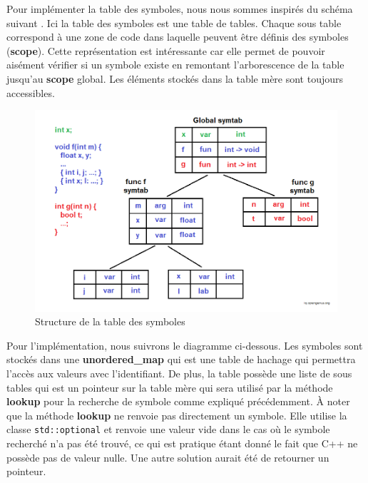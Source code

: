 \documentclass[a4paper]{article}%
\begin{document}
Pour implémenter la table des symboles, nous nous sommes inspirés du schéma
suivant \cite{symtableGenius}. Ici la table des symboles est une table de
tables. Chaque sous table correspond à une zone de code dans laquelle peuvent
être définis des symboles (\textbf{scope}). Cette représentation est
intéressante car elle permet de pouvoir aisément vérifier si un symbole existe
en remontant l'arborescence de la table jusqu'au \textbf{scope} global. Les
éléments stockés dans la table mère sont toujours accessibles.
\clearpage

\begin{figure}[h!]
  \begin{center}
  \includegraphics[scale=0.5]{./img/symtable.png}
  \caption{Structure de la table des symboles}
  \end{center}
\end{figure}

Pour l'implémentation, nous suivrons le diagramme ci-dessous. Les symboles sont
stockés dans une \textbf{unordered\_map} qui est une table de hachage qui
permettra l'accès aux valeurs avec l'identifiant. De plus, la table
possède une liste de sous tables qui est un pointeur sur la table mère qui sera
utilisé par la méthode \textbf{lookup} pour la recherche de symbole comme
expliqué précédemment. À noter que la méthode \textbf{lookup} ne renvoie pas
directement un symbole. Elle utilise la classe \lstinline{std::optional} et
renvoie une valeur vide dans le cas où le symbole recherché n'a pas été trouvé,
ce qui est pratique étant donné le fait que C++ ne possède pas de valeur nulle.
Une autre solution aurait été de retourner un pointeur.
\end{document}
